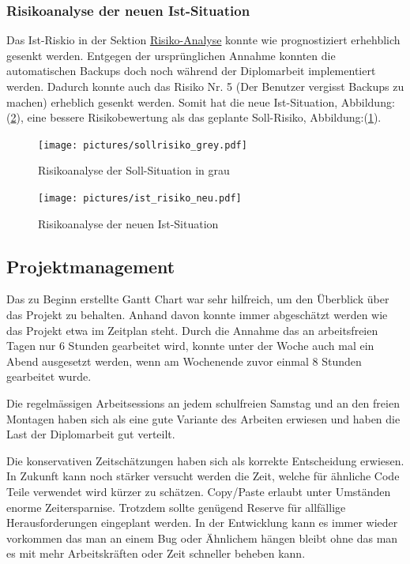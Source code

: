 \subsubsection{Risikoanalyse der neuen Ist-Situation}
\label{sec:orgc98cda5}

Das Ist-Riskio in der Sektion \hyperref[sec:org2347925]{Risiko-Analyse} konnte
wie prognostiziert erhehblich gesenkt werden. Entgegen der ursprünglichen
Annahme konnten die automatischen Backups doch noch während der Diplomarbeit
implementiert werden. Dadurch konnte auch das Risiko Nr. 5 (Der Benutzer
vergisst Backups zu machen) erheblich gesenkt werden. Somit hat die neue
Ist-Situation, Abbildung:(\ref{fig:org47eb5a8}), eine bessere Risikobewertung
als das geplante Soll-Risiko, Abbildung:(\ref{fig:sollgrau}).

\begin{figure}[H]
\centering
\texttt{[image: pictures/sollrisiko\_grey.pdf]}
\caption{\label{fig:sollgrau}
Risikoanalyse der Soll-Situation in grau}
\end{figure}

\begin{figure}[H]
\centering
\texttt{[image: pictures/ist\_risiko\_neu.pdf]}
\caption{\label{fig:org47eb5a8}
Risikoanalyse der neuen Ist-Situation}
\end{figure}
\newpage
\subsection{Projektmanagement}
\label{sec:orgb68b222}

Das zu Beginn erstellte Gantt Chart war sehr hilfreich, um den Überblick über
das Projekt zu behalten. Anhand davon konnte immer abgeschätzt werden wie das
Projekt etwa im Zeitplan steht. Durch die Annahme das an arbeitsfreien Tagen
nur 6 Stunden gearbeitet wird, konnte unter der Woche auch mal ein Abend
ausgesetzt werden, wenn am Wochenende zuvor einmal 8 Stunden gearbeitet wurde.

Die regelmässigen Arbeitsessions an jedem schulfreien Samstag und an den freien
Montagen haben sich als eine gute Variante des Arbeiten erwiesen und haben die
Last der Diplomarbeit gut verteilt.

Die konservativen Zeitschätzungen haben sich als korrekte Entscheidung
erwiesen. In Zukunft kann noch stärker versucht werden die Zeit, welche für
ähnliche Code Teile verwendet wird kürzer zu schätzen. Copy/Paste erlaubt unter
Umständen enorme Zeitersparnise. Trotzdem sollte genügend Reserve für
allfällige Herausforderungen eingeplant werden. In der Entwicklung kann es
immer wieder vorkommen das man an einem Bug oder Ähnlichem hängen bleibt ohne
das man es mit mehr Arbeitskräften oder Zeit schneller beheben kann.

